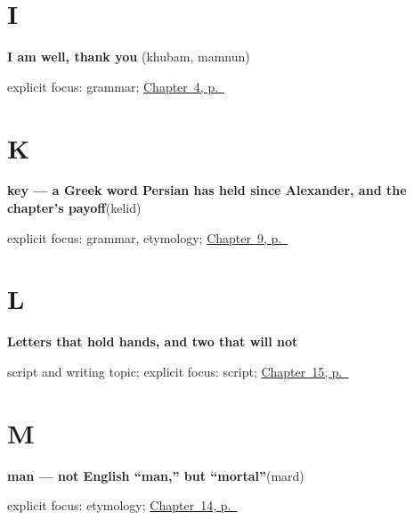 \section*{I}

\noindent\begin{minipage}[t]{\linewidth}
\raggedright
\textbf{I am well, thank you}\enspace\emph{ }\enspace(khubam, mamnun)\par
\footnotesize explicit focus: grammar; \hyperref[ch:fa-how-are-you]{Chapter~4, p.~\pageref*{ch:fa-how-are-you}}
\end{minipage}\par\smallskip

\section*{K}

\noindent\begin{minipage}[t]{\linewidth}
\raggedright
\textbf{key — a Greek word Persian has held since Alexander, and the chapter's payoff}\enspace\emph{}\enspace(kelid)\par
\footnotesize explicit focus: grammar, etymology; \hyperref[ch:fa-please-requests]{Chapter~9, p.~\pageref*{ch:fa-please-requests}}
\end{minipage}\par\smallskip

\section*{L}

\noindent\begin{minipage}[t]{\linewidth}
\raggedright
\textbf{Letters that hold hands, and two that will not}\par
\footnotesize script and writing topic; explicit focus: script; \hyperref[ch:fa-script-nine]{Chapter~15, p.~\pageref*{ch:fa-script-nine}}
\end{minipage}\par\smallskip

\section*{M}

\noindent\begin{minipage}[t]{\linewidth}
\raggedright
\textbf{man — not English \textquotedblleft{}man,\textquotedblright{} but \textquotedblleft{}mortal\textquotedblright{}}\enspace\emph{}\enspace(mard)\par
\footnotesize explicit focus: etymology; \hyperref[ch:fa-people-words]{Chapter~14, p.~\pageref*{ch:fa-people-words}}
\end{minipage}\par\smallskip

